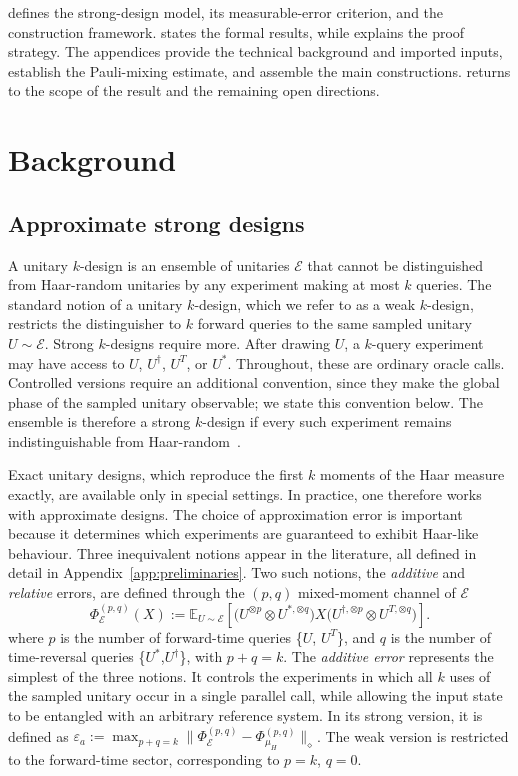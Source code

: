 \documentclass[
    aps,
    superscriptaddress,
    onecolumn,
    10pt,
    prx,
    nofootinbib
]{revtex4-2}
\newcommand{\E}{\mathbb E}
\newcommand{\cE}{\mathcal E}
\theoremstyle{namedstatement}
\theoremstyle{plain}
\begin{document}
 defines the strong-design model, its measurable-error criterion,
and the construction framework.  states the formal
results, while  explains the proof strategy. The appendices
provide the technical background and imported inputs, establish the Pauli-mixing
estimate, and assemble the main constructions.  returns to
the scope of the result and the remaining open directions.


\section{Background}\label{sec:comb}
\subsection{Approximate strong designs}
A unitary $k$-design is an ensemble of unitaries $\mathcal{E}$ that cannot be distinguished from Haar-random unitaries by any experiment making at most $k$ queries. The standard notion of a unitary $k$-design, which we refer to as a weak $k$-design, restricts the distinguisher to $k$ forward queries to the same sampled unitary $U\sim\mathcal E$. Strong $k$-designs require more. After drawing $U$, a $k$-query experiment may have access to $U$, $U^\dagger$, $U^T$, or $U^*$. Throughout, these are ordinary oracle calls. Controlled versions require an additional convention, since they make the global phase of the sampled unitary observable; we state this convention below. The ensemble is therefore a strong $k$-design if every such experiment remains indistinguishable from Haar-random~\cite{SchusterEtAlStrong2025}.

Exact unitary designs, which reproduce the first $k$ moments of the Haar measure exactly, are available only in special settings. In practice, one therefore works with approximate designs. The choice of approximation error is important because it determines which experiments are guaranteed to exhibit Haar-like behaviour. Three inequivalent notions appear in the literature, all defined in
detail in Appendix~\ref{app:preliminaries}. Two such notions, the \textit{additive} and \textit{relative} errors, are defined through the $(p,q)$ mixed-moment channel of $\cE$
\begin{equation}\label{eq:mixed-twirl-main}
    \Phi_{\cE}^{(p,q)}(X)
    :=
    \E_{U\sim\cE}\!\left[
        \bigl( U^{\otimes p} \otimes U^{*,\otimes q} \bigr)
        X
        \bigl( U^{\dagger,\otimes p} \otimes U^{T,\otimes q} \bigr)
    \right].
\end{equation}
where $p$ is the number of forward-time queries \{$U$, $U^T$\}, and $q$ is the number of time-reversal queries \{$U^*$,$U^{\dagger}$\}, with $p+q=k$. The \emph{additive error} represents the simplest of the three notions. It controls the experiments in which all $k$ uses of the sampled unitary occur in a single parallel call, while allowing the input state to be entangled with an arbitrary reference system. In its strong version, it is defined as $\varepsilon_{a}:=\max_{p+q=k}\|\Phi_{\cE}^{(p,q)}-\Phi_{\mu_H}^{(p,q)}\|_\diamond$. The weak version is restricted to the forward-time sector, corresponding to $p=k$, $q=0$.
\end{document}
